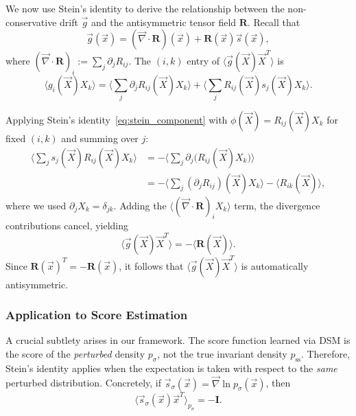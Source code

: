 \documentclass[%
  prl,
  reprint,
  amsmath,
  amssymb,
  aps
]{revtex4-2}
\newcommand{\vvec}[1]{\vec{#1}}
\begin{document}
We now use Stein's identity to derive the relationship between the non-conservative drift $\vvec{g}$ and the antisymmetric tensor field $\bm{R}$. Recall that
\begin{equation}
\vvec{g}(\vvec{x}) = (\vvec{\nabla} \cdot \bm{R})(\vvec{x}) + \bm{R}(\vvec{x}) \vvec{s}(\vvec{x}),
\end{equation}
where $(\vvec{\nabla} \cdot \bm{R})_i := \sum_j \partial_j R_{ij}$. The $(i,k)$ entry of $\langle \vvec{g}(\vvec{X}) \vvec{X}^T \rangle$ is
\begin{equation}
\langle g_i(\vvec{X}) X_k \rangle = \Big\langle \sum_j \partial_j R_{ij}(\vvec{X}) X_k \Big\rangle + \Big\langle \sum_j R_{ij}(\vvec{X}) s_j(\vvec{X}) X_k \Big\rangle.
\end{equation}

Applying Stein's identity~\eqref{eq:stein_component} with $\phi(\vvec{X}) = R_{ij}(\vvec{X}) X_k$ for fixed $(i,k)$ and summing over $j$:
\begin{equation}
\begin{aligned}
\Big\langle \sum_j s_j(\vvec{X}) R_{ij}(\vvec{X}) X_k \Big\rangle
&= -\Big\langle \sum_j \partial_j \big( R_{ij}(\vvec{X}) X_k \big) \Big\rangle \\
&= -\Big\langle \sum_j (\partial_j R_{ij})(\vvec{X}) X_k \Big\rangle - \langle R_{ik}(\vvec{X}) \rangle,
\end{aligned}
\end{equation}
where we used $\partial_j X_k = \delta_{jk}$. Adding the $\langle (\vvec{\nabla} \cdot \bm{R})_i X_k \rangle$ term, the divergence contributions cancel, yielding
\begin{equation}
\label{eq:g_R_relation}
\langle \vvec{g}(\vvec{X}) \vvec{X}^T \rangle = -\langle \bm{R}(\vvec{X}) \rangle.
\end{equation}
Since $\bm{R}(\vvec{x})^T = -\bm{R}(\vvec{x})$, it follows that $\langle \vvec{g}(\vvec{X}) \vvec{X}^T \rangle$ is automatically antisymmetric.

\subsubsection{Application to Score Estimation}

A crucial subtlety arises in our framework. The score function learned via DSM is the score of the \emph{perturbed} density $p_\sigma$, not the true invariant density $p_{\mathrm{ss}}$. Therefore, Stein's identity applies when the expectation is taken with respect to the \emph{same} perturbed distribution. Concretely, if $\vvec{s}_\sigma(\vvec{x}) = \vvec{\nabla} \ln p_\sigma(\vvec{x})$, then
\begin{equation}
\langle \vvec{s}_\sigma(\vvec{x}) \vvec{x}^T \rangle_{p_\sigma} = -\bm{I}.
\end{equation}
\end{document}
